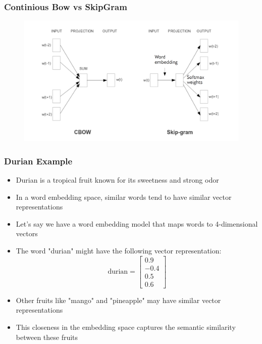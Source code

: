 \documentclass[compress, aspectratio=54]{beamer}
\begin{document}
\begin{frame}
\frametitle{Continious Bow vs SkipGram}
\begin{figure}
\includegraphics[width=1.1\linewidth ]{Figures/cbow-skipgram}
\end{figure}

\end{frame}


\begin{frame}
\frametitle{Durian Example}

\begin{itemize}
  \item Durian is a tropical fruit known for its sweetness and strong odor
  \item In a word embedding space, similar words tend to have similar vector representations
  \item Let's say we have a word embedding model that maps words to 4-dimensional vectors
  \item The word "durian" might have the following vector representation: \[ \text{{durian}} = \begin{bmatrix} 0.9  \\ -0.4 \\ 0.5 \\  0.6 \end{bmatrix} \]
  \item Other fruits like "mango" and "pineapple" may have similar vector representations
  \item This closeness in the embedding space captures the semantic similarity between these fruits
\end{itemize}

\end{frame}
\end{document}
